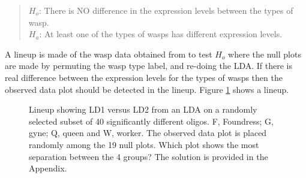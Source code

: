 \begin{quote}
$H_o$: There is NO difference in the expression levels between the types of wasp.\\
$H_a$: At least one of the types of wasps has different expression levels.
\end{quote}
A lineup is made of the wasp data obtained from \cite{toth:2010} to test $H_o$ where the null plots are made by permuting the wasp type label, and re-doing the LDA. If there is real difference between the expression levels for the types of wasps then the observed data plot should be detected in the lineup. Figure \ref{toth_lineup} shows a lineup. 

\begin{figure}[hbtp]
   \centering
       \caption{Lineup showing LD1 versus LD2 from an LDA on a randomly selected subset of 40 significantly different oligos. F, Foundress; G, gyne; Q, queen and W, worker. The observed data plot is placed randomly among the 19 null plots. Which plot shows the most separation between the 4 groups? The solution is provided in the Appendix.}
       \label{toth_lineup}
\end{figure} 

